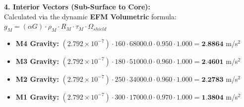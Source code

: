 \documentclass[11pt, a4paper]{article}
\begin{document}
  \vspace{0.5em}
  \noindent \textbf{4. Interior Vectors (Sub-Surface to Core):} \\[0.5em]
  \hspace*{1em} Calculated via the dynamic \textbf{EFM Volumetric} formula: $g_M = (\alpha G) \cdot \rho_{M} \cdot R_M \cdot \tau_M \cdot \Omega_{shield}$
  \begin{itemize}
    \item \textbf{M4 Gravity:} $(2.792 \times 10^{-7}) \cdot 160 \cdot 68000.0 \cdot 0.950 \cdot 1.000 = \textbf{2.8864}$ m/s$^2$
    \item \textbf{M3 Gravity:} $(2.792 \times 10^{-7}) \cdot 180 \cdot 51000.0 \cdot 0.960 \cdot 1.000 = \textbf{2.4601}$ m/s$^2$
    \item \textbf{M2 Gravity:} $(2.792 \times 10^{-7}) \cdot 250 \cdot 34000.0 \cdot 0.960 \cdot 1.000 = \textbf{2.2783}$ m/s$^2$
    \item \textbf{M1 Gravity:} $(2.792 \times 10^{-7}) \cdot 300 \cdot 17000.0 \cdot 0.970 \cdot 1.000 = \textbf{1.3804}$ m/s$^2$
  \end{itemize}
\end{document}
